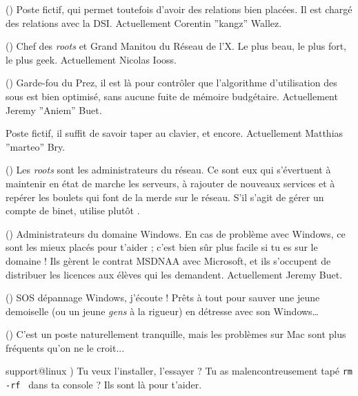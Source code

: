 \begin{description}

  \item[Le Prez]{() Poste fictif, qui permet toutefois d'avoir des relations bien plac\'ees. Il est chargé des relations avec la DSI. Actuellement Corentin ''kangz'' Wallez.}
  
  \item[Le Vice-Prez]{() Chef des \emph{roots} et Grand Manitou du Réseau de l'X. Le plus beau, le plus fort, le plus geek. Actuellement Nicolas Iooss.}

  \item[Trez]{() Garde-fou du Prez, il est là pour contrôler que l'algorithme d'utilisation des sous est bien optimisé, sans aucune fuite de mémoire budgétaire. Actuellement Jeremy ''Aniem'' Buet.}

  \item[Secrétaire]{Poste fictif, il suffit de savoir taper au clavier, et encore. Actuellement Matthias ''marteo'' Bry.}

  \item[root]{() Les \emph{roots} sont les administrateurs du r\'eseau. Ce sont eux qui s'\'evertuent \`a maintenir en \'etat de marche les serveurs, \`a rajouter de 
  nouveaux services et \`a rep\'erer les boulets qui font de la merde sur le r\'eseau. S'il s'agit de g\'erer un compte de binet, utilise plut\^ot .}

  \item[admin@windows] {() Administrateurs du domaine Windows. En cas de probl\`eme avec Windows, ce sont les mieux plac\'es pour t'aider ;
  c'est bien s\^ur  plus facile si tu es sur le domaine ! Ils gèrent le contrat
  MSDNAA avec Microsoft, et ils s'occupent de distribuer les licences aux élèves qui les demandent. Actuellement Jeremy Buet.}
  
  \item[support@windows] {() SOS d\'epannage Windows, j'\'ecoute ! Pr\^ets \`a tout pour sauver une jeune demoiselle (ou un jeune \emph{gens} \`a la rigueur) en d\'etresse avec son Windows\dots }

  \item[support@mac] {() C'est un poste naturellement tranquille, mais les problèmes sur Mac sont plus fréquents qu'on ne le croit... }
  
  \item{support@linux} {) Tu veux l'installer, l'essayer ? Tu as malencontreusement tapé \texttt{rm -rf \/} dans ta console ? Ils sont là pour t'aider.}
  

\end{description}

